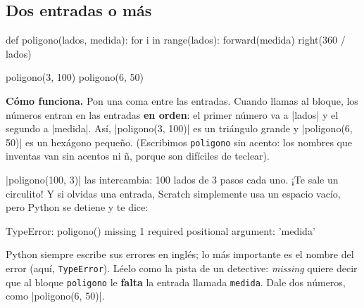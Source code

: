 \subsection*{Dos entradas o más}

\begin{tcbraster}[raster columns=2, raster equal height=rows, raster column skip=12pt, raster valign=center, raster force size=false, raster column 1/.style={add to width=-0.6cm}, raster column 2/.style={add to width=0.6cm}]
\begin{tcolorbox}[colback=white, colframe=white, boxrule=0pt, valign=center]
\begin{scratch}
\end{scratch}
\par\medskip
\begin{scratch}
\end{scratch}
\end{tcolorbox}
\begin{code}
def poligono(lados, medida):
    for i in range(lados):
        forward(medida)
        right(360 / lados)

poligono(3, 100)
poligono(6, 50)
\end{code}
\end{tcbraster}

\textbf{Cómo funciona.} Pon una coma entre las entradas. Cuando llamas al bloque, los números entran en las entradas \textbf{en orden}: el primer número va a \py|lados| y el segundo a \py|medida|. Así, \py|poligono(3, 100)| es un triángulo grande y \py|poligono(6, 50)| es un hexágono pequeño. (Escribimos \texttt{poligono} sin acento: los nombres que inventas van sin acentos ni ñ, porque son difíciles de teclear).

\begin{watchout}
\py|poligono(100, 3)| las intercambia: 100 lados de 3 pasos cada uno. ¡Te sale un circulito! Y si olvidas una entrada, Scratch simplemente usa un espacio vacío, pero Python se detiene y te dice:
\begin{errorbox}
TypeError: poligono() missing 1 required positional argument: 'medida'
\end{errorbox}
Python siempre escribe sus errores en inglés; lo más importante es el nombre del error (aquí, \texttt{TypeError}). Léelo como la pista de un detective: \textit{missing} quiere decir que al bloque \texttt{poligono} le \textbf{falta} la entrada llamada \texttt{medida}. Dale dos números, como \py|poligono(6, 50)|.
\end{watchout}

